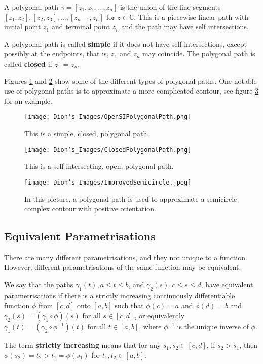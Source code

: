 \begin{defn}
\begin{defn}
A polygonal path $\gamma = [z_1, z_2, \ldots , z_n]$ is the
union of the line segments $[z_1, z_2], [z_2, z_3], \ldots, [z_{n-1}, z_n]$ for $z \in \mathbb{C}$. This is a piecewise linear path with initial point $z_1$ and terminal point $z_n$ and the path may have self intersections. \pause

A polygonal path is called \textbf{simple} if it does not have self intersections, except possibly at the endpoints, that is, $z_1$ and $z_n$ may coincide. The polygonal path is called \textbf{closed} if $z_1$ = $z_n$.
\end{defn}

Figures \ref{openppath} and \ref{closedppath} show some of the different types of polygonal paths. 
One notable use of polygonal paths is to approximate a more complicated contour, see figure \ref{approxcontour} for an example.

\begin{figure}[h]
\centering
\texttt{[image: Dion's\_Images/OpenSIPolygonalPath.png]}
\caption{This is a simple, closed, polygonal path.}
\label{openppath}
\end{figure}

\begin{figure}[h]
\centering
\texttt{[image: Dion's\_Images/ClosedPolygonalPath.png]}
\caption{This is a self-intersecting, open, polygonal path.}
\label{closedppath}
\end{figure}

\begin{figure}[h]
\centering
\texttt{[image: Dion's\_Images/ImprovedSemicircle.jpeg]}
\caption{In this picture, a polygonal path is used to approximate a semicircle complex contour with positive orientation.}
\label{approxcontour}
\end{figure}

\subsection{Equivalent Parametrisations}
There are many different parametrisations, and they not unique to a function.
However, different parametrisations of the same function may be equivalent.

\begin{defn}
We say that the paths $\gamma_1(t), a \leq t \leq b$, and $\gamma_2(s), c \leq s \leq d$, have equivalent parametrisations if there is a strictly increasing continuously differentiable function $\phi$ from $[c,d]$ onto $[a,b]$ such that $\phi(c) = a$ and $\phi(d) = b$ and $\gamma_2(s)=(\gamma_1 \circ \phi) (s)$ for all $s \in [c,d]$, or equivalently $\gamma_1(t)=(\gamma_2 \circ \phi^{-1})(t)$ for all $t \in [a,b]$, where $\phi^{-1}$ is the unique inverse of $\phi$.
\end{defn}
The term \textbf{strictly increasing} means that for any $s_1, s_2 \in [c,d]$, if $s_2 > s_1$, then $\phi(s_2) = t_2 > t_1 = \phi(s_1)$ for $t_1, t_2 \in [a,b]$.


\end{defn}
